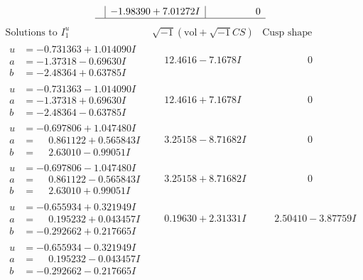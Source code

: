 \documentclass[1p]{elsarticle_modified}
\theoremstyle{definition}
\newcommand{\I}{\sqrt{-1}}
\begin{document}
$$\begin{array}{c|c|c}
 & -1.98390 + 7.01272 I & \phantom{-0.000000 } 0\\
 \hline 
 \end{array}$$\newpage$$\begin{array}{c|c|c}  
\text{Solutions to }I^u_{1}& \I (\text{vol} + \sqrt{-1}CS) & \text{Cusp shape}\\
 \hline 
\begin{aligned}
u &= -0.731363 + 1.014090 I \\
a &= -1.37318 - 0.69630 I \\
b &= -2.48364 + 0.63785 I\end{aligned}
 & \phantom{-}12.4616 - 7.1678 I & \phantom{-0.000000 } 0 \\ \hline\begin{aligned}
u &= -0.731363 - 1.014090 I \\
a &= -1.37318 + 0.69630 I \\
b &= -2.48364 - 0.63785 I\end{aligned}
 & \phantom{-}12.4616 + 7.1678 I & \phantom{-0.000000 } 0 \\ \hline\begin{aligned}
u &= -0.697806 + 1.047480 I \\
a &= \phantom{-}0.861122 + 0.565843 I \\
b &= \phantom{-}2.63010 - 0.99051 I\end{aligned}
 & \phantom{-}3.25158 - 8.71682 I & \phantom{-0.000000 } 0 \\ \hline\begin{aligned}
u &= -0.697806 - 1.047480 I \\
a &= \phantom{-}0.861122 - 0.565843 I \\
b &= \phantom{-}2.63010 + 0.99051 I\end{aligned}
 & \phantom{-}3.25158 + 8.71682 I & \phantom{-0.000000 } 0 \\ \hline\begin{aligned}
u &= -0.655934 + 0.321949 I \\
a &= \phantom{-}0.195232 + 0.043457 I \\
b &= -0.292662 + 0.217665 I\end{aligned}
 & \phantom{-}0.19630 + 2.31331 I & \phantom{-}2.50410 - 3.87759 I \\ \hline\begin{aligned}
u &= -0.655934 - 0.321949 I \\
a &= \phantom{-}0.195232 - 0.043457 I \\
b &= -0.292662 - 0.217665 I\end{aligned}

\end{array}$$
\end{document}
